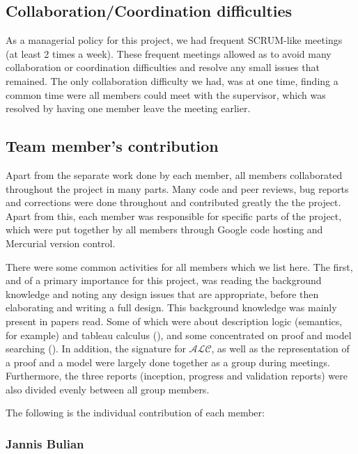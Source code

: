 \subsection{Collaboration/Coordination difficulties}

As a managerial policy for this project, we had frequent SCRUM-like meetings (at least 2 times a week). These frequent meetings allowed as to avoid many collaboration or coordination difficulties and resolve any small issues that remained. The only collaboration difficulty we had, was at one time, finding a common time were all members could meet with the supervisor, which was resolved by having one member leave the meeting earlier.

\subsection{Team member's contribution}

Apart from the separate work done by each member, all members collaborated throughout the project in many parts. Many code and peer reviews, bug reports and corrections were done
throughout and contributed greatly the the project. Apart from this, each member was responsible for specific parts of the project, which were put together by all members through Google code hosting and Mercurial version control. 

There were some common activities for all members which we list here. The first, and of a primary importance for this project, was reading the background knowledge and noting any design issues that are appropriate, before then elaborating and writing a full design. This background knowledge was mainly present in papers read. Some of which were about description logic (semantics, for example) and tableau calculus (\cite{baadernutt02,gore99}), and some concentrated on proof and model searching (\cite{Gore:2010:OTA,gore07}). In addition, the signature for $\mathcal{ALC}$, as well as the representation of a proof and a model were largely done together as a group during meetings. Furthermore, the three reports (inception, progress and validation reports) were also divided evenly between all group members.

The following is the individual contribution of each member:

\subsubsection*{Jannis Bulian}

